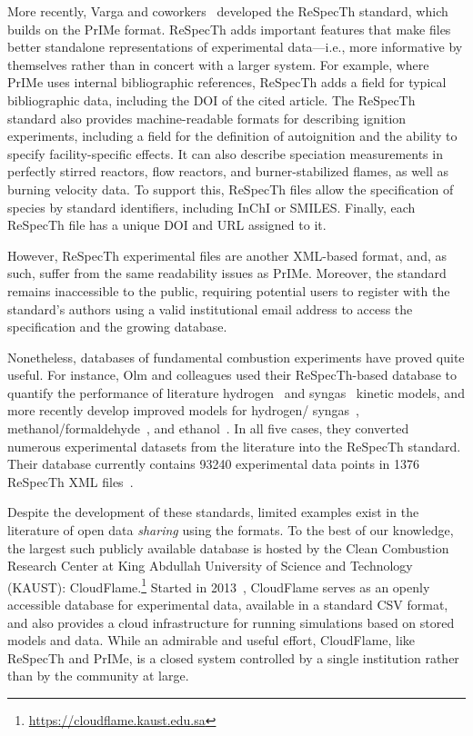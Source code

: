 \documentclass[12pt]{ijck}
\begin{document}
More recently, Varga and coworkers~\autocite{Varga2015a,Varga2017} developed the
ReSpecTh standard, which builds on the PrIMe format. ReSpecTh adds important
features that make files better standalone representations of experimental
data---i.e., more informative by themselves rather than in concert with a larger
system. For example, where PrIMe uses internal bibliographic references,
ReSpecTh adds a field for typical bibliographic data, including the DOI of
the cited article. The ReSpecTh standard also
provides machine-readable formats for describing ignition experiments, including
a field for the definition of autoignition and the ability to specify
facility-specific effects. It can also describe speciation measurements in
perfectly stirred reactors, flow reactors, and burner-stabilized flames, as well as
burning velocity data. To support this, ReSpecTh files allow the specification of species by
standard identifiers, including InChI or SMILES. Finally, each ReSpecTh file
has a unique DOI and URL assigned to it.

However, ReSpecTh experimental files are another
XML-based format, and, as such, suffer from the same readability issues as PrIMe.
Moreover, the standard remains inaccessible to the public, requiring potential users
to register with the standard's authors using a valid institutional email address
to access the specification and the growing database.

Nonetheless, databases of fundamental combustion experiments
have proved quite useful. For instance, Olm and colleagues used their
ReSpecTh-based database to quantify the performance of literature
hydrogen~\autocite{Olm:2014gn} and syngas~\autocite{Olm:2015ch} kinetic models,
and more recently develop improved models for hydrogen\slash
syngas~\autocite{Varga:2016gj}, methanol\slash formaldehyde~\autocite{Olm:2017a},
and ethanol~\autocite{Olm:2016et}. In all five cases, they converted numerous
experimental datasets from the literature into the ReSpecTh standard.
Their database currently contains \num{93240} experimental data points in 1376
ReSpecTh XML files~\autocite{respecth}.

Despite the development of these standards, limited examples exist in the
literature of open data \emph{sharing} using the formats. To the best
of our knowledge, the largest such publicly available database is hosted by
the Clean Combustion Research Center at King Abdullah University of Science and
Technology (KAUST): CloudFlame.\footnote{\url{https://cloudflame.kaust.edu.sa}}
Started in 2013~\autocite{Goteng:2013cf,Goteng:2014,ReynoChiasson:2015}, CloudFlame
serves as an openly accessible database for experimental data, available in a standard
CSV format, and also provides a cloud infrastructure for running simulations
based on stored models and data. While an admirable and useful effort,
CloudFlame, like ReSpecTh and PrIMe, is a closed system controlled by a single
institution rather than by the community at large.
\end{document}

